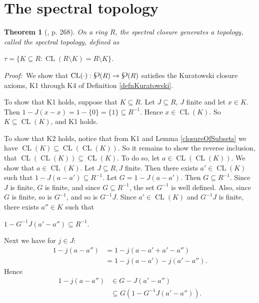\documentclass[12pt, oneside]{book}
\newtheorem{theorem}{Theorem}[subsection]
\newcommand{\proof}{{\noindent \it Proof:~}}
\newcommand{\powerset}{\raisebox{.15\baselineskip}{\Large\ensuremath{\wp}}}
\def\CL{\operatorname{CL}}
\begin{document}
\section{The spectral topology}

\begin{theorem}[\cite{CH3}, p. 268] \label{TheSpectralTopology}
\normalfont
On a ring $R$, the spectral closure generates a topology, called {\sl the spectral topology}, defined as
\begin{center}
$\tau=\{ K \subseteq R: \CL(R \setminus K) = R \setminus K \}$.
\end{center}
\end{theorem}

\proof \space We show that 
$\CL(\cdot): \powerset(R) \rightarrow \powerset(R)$ satisfies the Kuratowski closure axioms, K1 through 
K4 of Definition \ref{defnKuratowski}.

\vskip 0.3cm

\noindent To show that K1 holds, suppose that $K \subseteq R$. Let $J \subseteq R$, $J$ finite and 
let $x \in K$. Then $1-J(x-x)= 1 - \{0 \} = \{1\} \subseteq R^{-1}$. Hence $x \in \CL(K)$. 
So $K \subseteq \CL(K)$, and K1 holds.

\vskip 0.3cm

\noindent To show that K2 holds, notice that from K1 and Lemma \ref{closureOfSubsets} we have 
$\CL(K)\subseteq \CL(\CL(K))$. So it remains to show the reverse inclusion, that 
$\CL(\CL(K)) \subseteq \CL(K)$. 
To do so, let $a \in \CL(\CL(K))$. We show that $a \in \CL(K)$. Let $J \subseteq R, J$ finite. 
Then there exists $a' \in \CL(K)$ such that $1-J(a-a') \subseteq R^{-1}$. Let $G = 1-J(a-a')$. 
Then $G \subseteq R^{-1}$. Since $J$ is finite, $G$ is finite, and since $G \subseteq R^{-1}$, the set 
$G^{-1}$ is well defined. Also, since $G$ is finite, so is $G^{-1}$, and so is $G^{-1}J$.
\vskip 0.3cm 
\noindent Since $a' \in \CL(K)$ and $G^{-1}J$ is finite, there exists $a'' \in K$ such that 
\begin{center}
$1-G^{-1} J(a'-a'') \subseteq R^{-1}$. 
\end{center}
Next we have for $j \in J$:
\begin{align*}
1-j(a-a'') 
&= 1-j(a-a'+a'-a'')\\
&= 1-j(a-a')-j(a'-a'').
\end{align*}
Hence
\begin{align*}
1-j(a-a'') 
&\in G-J(a'-a'')\\
&\subseteq G(1 - G^{-1} J(a'-a'')).
\end{align*}		
			
\end{document}
